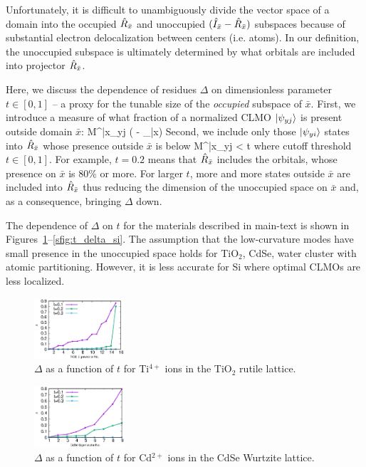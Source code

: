 \documentclass[aps,prl,twocolumn,reprint,amsmath,amssymb]{revtex4-1}
\begin{document}
Unfortunately, it is difficult to unambiguously divide the vector space of a domain into the occupied $\hat{R}_{\bar{x}}$ and unoccupied $(\hat{I}_{\bar{x}} - \hat{R}_{\bar{x}})$ subspaces because of substantial electron delocalization between centers (i.e. atoms). 
In our definition, the unoccupied subspace is ultimately determined by what orbitals are included into projector $\hat{R}_{\bar{x}}$. 

Here, we discuss the dependence of residues $\Delta$ on dimensionless parameter $t \in [0,1]$ -- a proxy for the tunable size of the \emph{occupied} subspace of $\bar{x}$. First, we introduce a measure of what fraction of a normalized CLMO $\vert \psi_{yj} \rangle$ is present outside domain $\bar{x}$:
\bea
M^{\bar{x}}_{yj} \equiv {} ( - _{\bar{x}}) 
\eea
%
Second, we include only those $\vert \psi_{yi} \rangle$ states into $\hat{R}_{\bar{x}}$ whose presence outside $\bar{x}$ is below
\bea
M^{\bar{x}}_{yj} < t
\eea
%
where cutoff threshold $t \in [0,1]$. 
For example, $t = 0.2$ means that $\hat{R}_{\bar{x}}$ includes the orbitals, whose presence on $\bar{x}$ is 80\% or more. 
For larger $t$, more and more states outside $\bar{x}$ are included into $\hat{R}_{\bar{x}}$ thus reducing the dimension of the unoccupied space on $\bar{x}$ and, as a consequence, bringing $\Delta$ down.

The dependence of $\Delta$ on $t$ for the materials described in main-text is shown in Figures~\ref{sfig:t_delta_tio2}--\ref{sfig:t_delta_si}. 
The assumption that the low-curvature modes have small presence in the unoccupied space holds for TiO$_2$, CdSe, water cluster with atomic partitioning. However, it is less accurate for Si where optimal CLMOs are less localized.

\begin{figure}
\centering
\includegraphics[width=0.3\textwidth]{t_tio2_residue}
\caption{$\Delta$ as a function of $t$ for Ti$^{4+}$ ions in the TiO$_2$ rutile lattice.}
\label{sfig:t_delta_tio2}
\end{figure}

\begin{figure}
\centering
\includegraphics[width=0.3\textwidth]{t_cdse_residue}
\caption{$\Delta$ as a function of $t$ for Cd$^{2+}$ ions in the CdSe Wurtzite lattice.}
\label{sfig:t_delta_cdse}
\end{figure}
\end{document}
